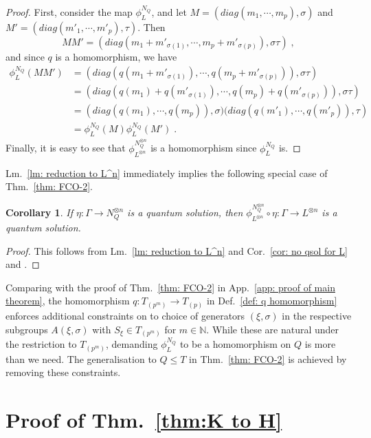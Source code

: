 \documentclass[aps,pra,letterpaper,onrcolumn,nofootinbib,notitlepage,longbibliography]{revtex4-1}
\newtheorem{corollary}{Corollary}
\newcommand{\mf}[1]{#1}
\newcommand{\ra}{\ensuremath{\rightarrow}}
\begin{document}
\begin{proof}
    First, consider the map $\phi^{N_Q}_{L}$, and let $M=(diag(m_1,\cdots,m_p),\sigma)$ and $M'=(diag(m'_1,\cdots,m'_p),\tau)$. Then
    $$MM'=(diag(m_1+m'_{\sigma(1)},\cdots,m_p+m'_{\sigma(p)}),\sigma\tau)\; ,$$
    and since $q$ is a homomorphism, we have
    \begin{align*}
        \phi^{N_Q}_{L}(MM')
        &=\left(diag(q(m_1+m'_{\sigma(1)}),\cdots,q(m_p+m'_{\sigma(p)})),\sigma\tau\right)\\
        &=\left(diag(q(m_1)+q(m'_{\sigma(1)}),\cdots,q(m_p)+q(m'_{\sigma(p)})),\sigma\tau\right)\\
        &=\left(diag(q(m_1),\cdots,q(m_p)),\sigma)(diag(q(m'_1),\cdots,q(m'_p)),\tau\right)\\
        &=\phi^{N_Q}_{L}(M)\phi^{N_Q}_{L}(M')\; .
    \end{align*}
    Finally, it is easy to see that $\phi^{N_Q^{\otimes n}}_{L^{\otimes n}}$ is a homomorphism since $\phi^{N_Q}_{L}$ is.
\end{proof}

Lm.~\ref{lm: reduction to L^n} immediately implies the following special case of Thm.~\ref{thm: FCO-2}.

\begin{corollary}
    \mf{If $\eta:\Gamma\to N_Q^{\otimes n}$ is a quantum solution, then $\phi^{N_Q^{\otimes n}}_{L^{\otimes n}}\circ \eta:\Gamma\to L^{\otimes n}$ is a quantum solution.}
\end{corollary}

\begin{proof}
    This follows from Lm.~\ref{lm: reduction to L^n} and Cor.~\ref{cor: no qsol for L} and \cite[Cor.~4]{FrembsChungOkay2022}.
\end{proof}

Comparing with the proof of Thm.~\ref{thm: FCO-2} in App.~\ref{app: proof of main theorem}, the homomorphism $q:T_{(p^m)}\ra T_{(p)}$ in Def.~\ref{def: q homomorphism} enforces additional constraints on  to choice of generators $(\xi,\sigma)$ in the respective subgroups $A(\xi,\sigma)$ with $S_\xi\in T_{(p^m)}$ for $m\in\mathbb{N}$. While these are natural under the restriction to $T_{(p^m)}$, demanding $\phi^{N_Q}_L$ to be a homomorphism on $Q$ is more than we need. The generalisation to $Q\leq T$ in Thm.~\ref{thm: FCO-2} is achieved by removing these constraints.
\section{Proof of Thm.~\ref{thm:K to H}}\label{app: old lemmata}
\end{document}
